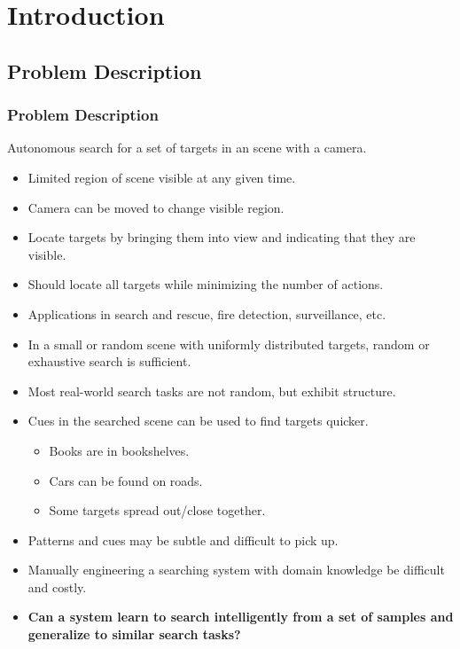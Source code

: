 
\section{Introduction}

\subsection{Problem Description}

\begin{frame}
    \frametitle{Problem Description}
    
    Autonomous search for a set of targets in an scene with a camera.
    
    \begin{itemize}
        \item Limited region of scene visible at any given time. 
        \item Camera can be moved to change visible region.
        \item Locate targets by bringing them into view and indicating that they are visible.
        \item Should locate all targets while minimizing the number of actions.
        \item Applications in search and rescue, fire detection, surveillance, etc.
    \end{itemize}
\end{frame}

\begin{frame}
    \begin{itemize}
        \item In a small or random scene with uniformly distributed targets, random or exhaustive search is sufficient.
        \item Most real-world search tasks are not random, but exhibit structure.
        \item Cues in the searched scene can be used to find targets quicker.
        \begin{itemize}
            \item Books are in bookshelves.
            \item Cars can be found on roads.
            \item Some targets spread out/close together.
        \end{itemize}
        \item Patterns and cues may be subtle and difficult to pick up.
        \item Manually engineering a searching system with domain knowledge be difficult and costly.
        \item \textbf{Can a system learn to search intelligently from a set of samples and generalize to similar search tasks?}
    \end{itemize}
\end{frame}

